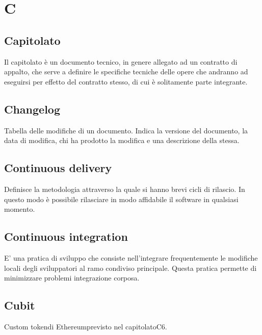 \section*{C}
\subsection*{Capitolato}
Il capitolato è un documento tecnico, in genere allegato ad un contratto di appalto, che serve a definire le specifiche tecniche delle opere che andranno ad eseguirsi per effetto del contratto stesso, di cui è solitamente parte integrante.

\subsection*{Changelog}
Tabella delle modifiche di un documento. Indica la versione del documento, la data di modifica, chi ha prodotto
la modifica e una descrizione della stessa.

\subsection*{Continuous delivery}
Definisce la metodologia attraverso la quale si hanno brevi cicli di rilascio. In questo modo è possibile rilasciare in modo affidabile il software in qualsiasi momento.

\subsection*{Continuous integration}
E’ una pratica di sviluppo che consiste nell’integrare frequentemente le modifiche locali degli sviluppatori al
ramo condiviso principale. Questa pratica permette di minimizzare problemi integrazione corposa.

\subsection*{Cubit}
Custom token\glosp di Ethereum\glosp previsto nel capitolato\glosp C6.

